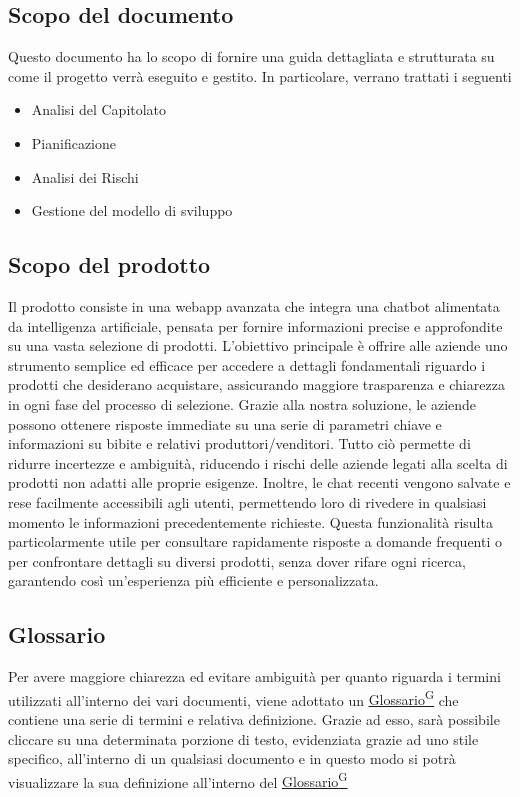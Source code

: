 \documentclass{article}
\begin{document}
    \subsection{Scopo del documento}
    Questo documento ha lo scopo di fornire una guida dettagliata e strutturata su come
    il progetto verrà eseguito e gestito. In particolare, verrano trattati i seguenti
    \begin{itemize}
        \item Analisi del Capitolato
        \item Pianificazione
        \item Analisi dei Rischi
        \item Gestione del modello di sviluppo
    \end{itemize}

    \subsection{Scopo del prodotto}
    Il prodotto consiste in una webapp avanzata che integra una chatbot alimentata da intelligenza artificiale,
    pensata per fornire informazioni precise e approfondite su una vasta selezione di prodotti. L’obiettivo principale è
    offrire alle aziende uno strumento semplice ed efficace per accedere a dettagli fondamentali riguardo i prodotti che
    desiderano acquistare, assicurando maggiore trasparenza e chiarezza in ogni fase del processo di selezione. Grazie alla
    nostra soluzione, le aziende possono ottenere risposte immediate su una serie di parametri chiave e informazioni su bibite e relativi produttori/venditori.
    Tutto ciò permette di ridurre incertezze e ambiguità, riducendo i rischi delle aziende legati alla scelta di prodotti non adatti alle proprie esigenze.
    Inoltre, le chat recenti vengono salvate e rese facilmente accessibili agli utenti, permettendo loro di rivedere in qualsiasi
    momento le informazioni precedentemente richieste. Questa funzionalità risulta particolarmente utile per consultare rapidamente
    risposte a domande frequenti o per confrontare dettagli su diversi prodotti, senza dover rifare ogni ricerca, garantendo così
    un'esperienza più efficiente e personalizzata.

    \subsection{Glossario}
    Per avere maggiore chiarezza ed evitare ambiguità per quanto riguarda i termini utilizzati all'interno dei vari documenti,
    viene adottato un \href{https://code7crusaders.github.io/docs/RTB/documentazione_interna/glossario.html#glossario}{Glossario\textsuperscript{G}} che contiene una serie di termini e relativa definizione.
    Grazie ad esso, sarà possibile cliccare su una determinata porzione di testo, evidenziata grazie ad uno stile specifico,
    all'interno di un qualsiasi documento e in questo modo si potrà visualizzare la sua definizione all'interno
    del \href{https://code7crusaders.github.io/docs/RTB/documentazione_interna/glossario.html#glossario}{Glossario\textsuperscript{G}}
\end{document}

